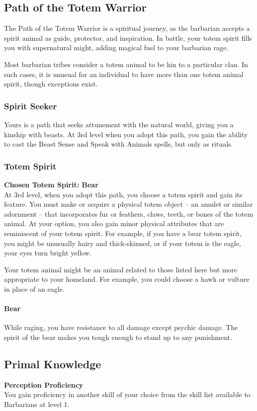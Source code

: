 \documentclass[letterpaper,openany,oneside,twocolumn]{book}
\begin{document}
\subsection*{Path of the Totem Warrior}
The Path of the Totem Warrior is a spiritual journey, as the barbarian accepts a spirit animal as guide, protector, and inspiration. In battle, your totem spirit fills you with supernatural might, adding magical fuel to your barbarian rage.

Most barbarian tribes consider a totem animal to be kin to a particular clan. In such cases, it is unusual for an individual to have more than one totem animal spirit, though exceptions exist.
\subsubsection*{Spirit Seeker}
Yours is a path that seeks attunement with the natural world, giving you a kinship with beasts. At 3rd level when you adopt this path, you gain the ability to cast the Beast Sense and Speak with Animals spells, but only as rituals.
\subsubsection*{Totem Spirit}
\textbf{Chosen Totem Spirit: Bear}\\
At 3rd level, when you adopt this path, you choose a totem spirit and gain its feature. You must make or acquire a physical totem object – an amulet or similar adornment – that incorporates fur or feathers, claws, teeth, or bones of the totem animal. At your option, you also gain minor physical attributes that are reminiscent of your totem spirit. For example, if you have a bear totem spirit, you might be unusually hairy and thick-skinned, or if your totem is the eagle, your eyes turn bright yellow.

Your totem animal might be an animal related to those listed here but more appropriate to your homeland. For example, you could choose a hawk or vulture in place of an eagle.

\paragraph*{Bear} While raging, you have resistance to all damage except psychic damage. The spirit of the bear makes you tough enough to stand up to any punishment.
\subsection*{Primal Knowledge}
\textbf{Perception Proficiency}\\
You gain proficiency in another skill of your choice from the skill list available to Barbarians at level 1.
\end{document}
